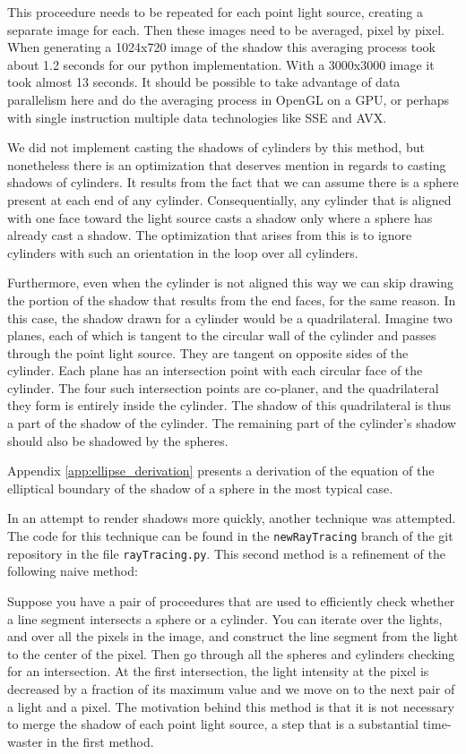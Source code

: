 \documentclass[10pt]{article}
\begin{document}
This proceedure needs to be repeated for each point light source, creating a separate image for each. Then these images need to be averaged, pixel by pixel. When generating a 1024x720 image of the shadow this averaging process took about 1.2 seconds for our python implementation. With a 3000x3000 image it took almost 13 seconds. It should be possible to take advantage of data parallelism here and do the averaging process in OpenGL on a GPU, or perhaps with single instruction multiple data technologies like SSE and AVX.

We did not implement casting the shadows of cylinders by this method, but nonetheless there is an optimization that deserves mention in regards to casting shadows of cylinders. It results from the fact that we can assume there is a sphere present at each end of any cylinder. Consequentially, any cylinder that is aligned with one face toward the light source casts a shadow only where a sphere has already cast a shadow. The optimization that arises from this is to ignore cylinders with such an orientation in the loop over all cylinders.

Furthermore, even when the cylinder is not aligned this way we can skip drawing the portion of the shadow that results from the end faces, for the same reason. In this case, the shadow drawn for a cylinder would be a quadrilateral. Imagine two planes, each of which is tangent to the circular wall of the cylinder and passes through the point light source. They are tangent on opposite sides of the cylinder. Each plane has an intersection point with each circular face of the cylinder. The four such intersection points are co-planer, and the quadrilateral they form is entirely inside the cylinder. The shadow of this quadrilateral is thus a part of the shadow of the cylinder. The remaining part of the cylinder's shadow should also be shadowed by the spheres.

Appendix \ref{app:ellipse_derivation} presents a derivation of the equation of the elliptical boundary of the shadow of a sphere in the most typical case.

In an attempt to render shadows more quickly, another technique was attempted. The code for this technique can be found in the \texttt{newRayTracing} branch of the git repository in the file \texttt{rayTracing.py}. This second method is a refinement of the following naive method:

Suppose you have a pair of proceedures that are used to efficiently check whether a line segment intersects a sphere or a cylinder. You can iterate over the lights, and over all the pixels in the image, and construct the line segment from the light to the center of the pixel. Then go through all the spheres and cylinders checking for an intersection. At the first intersection, the light intensity at the pixel is decreased by a fraction of its maximum value and we move on to the next pair of a light and a pixel. The motivation behind this method is that it is not necessary to merge the shadow of each point light source, a step that is a substantial time-waster in the first method.
\end{document}
